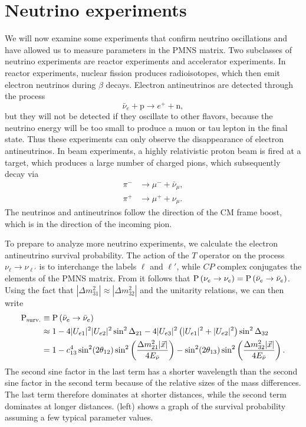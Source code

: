 \section{Neutrino experiments}
We will now examine some experiments that confirm neutrino oscillations and
have allowed us to measure parameters in the PMNS matrix.
Two subclasses of neutrino experiments are reactor experiments
and accelerator experiments. In reactor experiments, nuclear fission produces
radioisotopes, which then emit electron neutrinos during $\beta$ decays.
Electron antineutrinos are detected through the process
\begin{equation}
  \label{eq:betadecay}
  \bar{\nu}_e+\text{p}\to e^++\text{n},
\end{equation}
but they will not be detected if they oscillate to other flavors, because
the neutrino energy will be too small to produce a muon or tau lepton in
the final state. Thus these experiments can only observe the disappearance
of electron antineutrinos. In beam experiments, a highly relativistic
proton beam is fired at a target, which produces a large number of charged
pions, which subsequently decay via
\begin{equation}
  \begin{aligned}
    \pi^-&\to\mu^-+\bar{\nu}_\mu, \\
    \pi^+&\to\mu^++\nu_\mu.
  \end{aligned}
\end{equation}
The neutrinos and antineutrinos follow the direction of the CM frame boost,
which is in the direction of the incoming pion.

To prepare to analyze more neutrino experiments, we calculate the
electron antineutrino survival probability.
The action of the $T$ operator on the process $\nu_\ell\to\nu_{\ell'}$ is
to interchange the labels $\ell$ and $\ell'$, while $CP$ complex conjugates
the elements of the PMNS matrix. From  it follows
that $\operatorname{P}\left(\nu_e\to\nu_e\right)=\operatorname{P}\left(\bar{\nu}_e\to\bar{\nu}_e\right)$. Using the fact
that $|\Delta m_{31}^2|\approx|\Delta m_{32}^2|$ and the unitarity relations,
we can then write
\begin{equation}
  \label{eq:prb}
  \begin{aligned}
    {\rm P}_{\rm surv.}&\equiv\operatorname{P}\left(\bar{\nu}_e\to\bar{\nu}_e\right)\\
      &\approx 1-4|U_{e1}|^2|U_{e2}|^2\sin^2\Delta_{21}
              -4|U_{e3}|^2\left(|U_{e1}|^2+|U_{e2}|^2\right)\sin^2\Delta_{32}
       \\ 
      &= 1-c_{13}^4\sin^2(2\theta_{12})
           \sin^2\left(\frac{\Delta m_{21}^2 |\vec{x}|}{4E_{\bar{\nu}}}
           \right) -\sin^2(2\theta_{13})
           \sin^2\left(\frac{\Delta m_{32}^2 |\vec{x}|}{4E_{\bar{\nu}}}
           \right).
  \end{aligned}
\end{equation}
The second sine factor in the last term has a shorter wavelength than the
second sine factor in the second term because of the relative sizes of the
mass differences. The last term therefore dominates at shorter distances,
while the second term dominates at longer distances. 
(left) shows a graph of the survival probability assuming a few typical 
parameter values.


